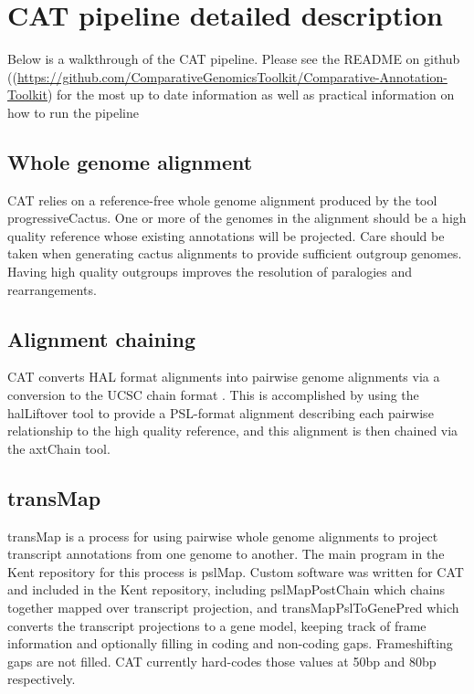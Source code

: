 \documentclass[fleqn,10pt]{wlscirep}
\begin{document}
\section*{CAT pipeline detailed description}

Below is a walkthrough of the CAT pipeline. Please see the README on github ((\url{https://github.com/ComparativeGenomicsToolkit/Comparative-Annotation-Toolkit}) for the most up to date information as well as practical information on how to run the pipeline 

\subsection*{Whole genome alignment}
	CAT relies on a reference-free whole genome alignment produced by the tool progressiveCactus. One or more of the genomes in the alignment should be a high quality reference whose existing annotations will be projected. Care should be taken when generating cactus alignments to provide sufficient outgroup genomes. Having high quality outgroups improves the resolution of paralogies and rearrangements.

\subsection*{Alignment chaining}
	CAT converts HAL format alignments into pairwise genome alignments via a conversion to the UCSC chain format \cite{kent2003evolution}. This is accomplished by using the halLiftover tool to provide a PSL-format alignment describing each pairwise relationship to the high quality reference, and this alignment is then chained via the axtChain tool. 
    
\subsection*{transMap}
	transMap \cite{stanke2008using,zhu2007comparative} is a process for using pairwise whole genome alignments to project transcript annotations from one genome to another. The main program in the Kent repository for this process is pslMap. Custom software was written for CAT and included in the Kent repository, including pslMapPostChain which chains together mapped over transcript projection, and transMapPslToGenePred which converts the transcript projections to a gene model, keeping track of frame information and optionally filling in coding and non-coding gaps. Frameshifting gaps are not filled. CAT currently hard-codes those values at 50bp and 80bp respectively.
    
\end{document}
